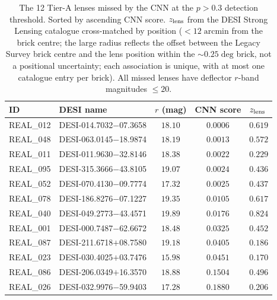 \documentclass[fleqn,usenatbib]{rasti}
\begin{document}
\begin{table}
\centering
\caption{The 12 Tier-A lenses missed by the CNN at the $p > 0.3$ detection threshold.  Sorted by ascending CNN score.  $z_{\rm lens}$ from the DESI Strong Lensing catalogue cross-matched by position ($< 12\;\mathrm{arcmin}$ from the brick centre; the large radius reflects the offset between the Legacy Survey brick centre and the lens position within the $\sim\!0.25\;\mathrm{deg}$ brick, not a positional uncertainty; each association is unique, with at most one catalogue entry per brick).  All missed lenses have deflector $r$-band magnitudes $\leq 20$.}
\label{tab:missed}
\small
\setlength{\tabcolsep}{4pt}
\begin{tabular}{llccl}
\hline
ID & DESI name & $r$ (mag) & CNN score & $z_{\rm lens}$ \\
\hline
REAL\_012 & DESI-014.7032$-$07.3658 & $18.10$ & $0.0006$ & $0.619$ \\
REAL\_048 & DESI-063.0145$-$18.9874 & $18.19$ & $0.0013$ & $0.572$ \\
REAL\_011 & DESI-011.9630$-$32.8146 & $18.38$ & $0.0022$ & $0.229$ \\
REAL\_095 & DESI-315.3666$-$43.8105 & $19.07$ & $0.0024$ & $0.436$ \\
REAL\_052 & DESI-070.4130$-$09.7774 & $17.32$ & $0.0025$ & $0.437$ \\
REAL\_078 & DESI-186.8276$-$07.1227 & $19.35$ & $0.0105$ & $0.617$ \\
REAL\_040 & DESI-049.2773$-$43.4571 & $19.89$ & $0.0176$ & $0.824$ \\
REAL\_001 & DESI-000.7487$-$62.6672 & $18.48$ & $0.0325$ & $0.452$ \\
REAL\_087 & DESI-211.6718$+$08.7580 & $19.18$ & $0.0405$ & $0.186$ \\
REAL\_023 & DESI-030.4025$+$03.7476 & $15.98$ & $0.0451$ & $0.170$ \\
REAL\_086 & DESI-206.0349$+$16.3570 & $18.88$ & $0.1504$ & $0.496$ \\
REAL\_026 & DESI-032.9976$-$59.9403 & $17.28$ & $0.1880$ & $0.206$ \\
\hline
\end{tabular}
\end{table}


\bsp
\label{lastpage}
\end{document}
